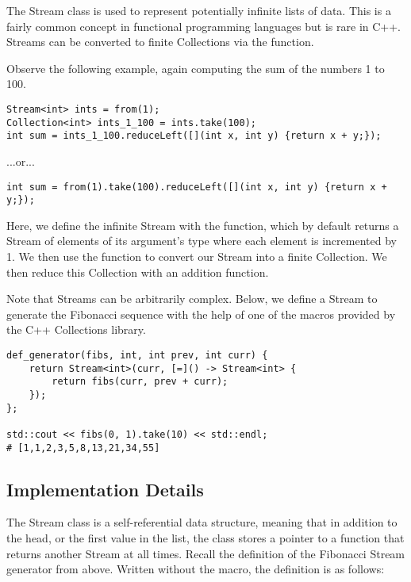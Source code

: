 
The Stream class is used to represent potentially infinite lists of data.
This is a fairly common concept in functional programming languages but is rare in C++.
Streams can be converted to finite Collections via the  function.

Observe the following example, again computing the sum of the numbers 1 to 100.

\begin{lstlisting}
Stream<int> ints = from(1);
Collection<int> ints_1_100 = ints.take(100);
int sum = ints_1_100.reduceLeft([](int x, int y) {return x + y;});
\end{lstlisting}

...or...

\begin{lstlisting}
int sum = from(1).take(100).reduceLeft([](int x, int y) {return x + y;});
\end{lstlisting}

Here, we define the infinite Stream with the  function, which by default returns a Stream of elements of its argument's type where each element is incremented by 1.
We then use the  function to convert our Stream into a finite Collection.
We then reduce this Collection with an addition function.

Note that Streams can be arbitrarily complex.
Below, we define a Stream to generate the Fibonacci sequence with the help of one of the macros provided by the C++ Collections library.

\begin{lstlisting}
def_generator(fibs, int, int prev, int curr) {
    return Stream<int>(curr, [=]() -> Stream<int> {
        return fibs(curr, prev + curr);
    });
};

std::cout << fibs(0, 1).take(10) << std::endl;
# [1,1,2,3,5,8,13,21,34,55]
\end{lstlisting}





\subsection{Implementation Details}

The Stream class is a self-referential data structure, meaning that in addition to the head, or the first value in the list, the class stores a pointer to a function that returns another Stream at all times.
Recall the definition of the Fibonacci Stream generator from above.
Written without the macro, the definition is as follows:

